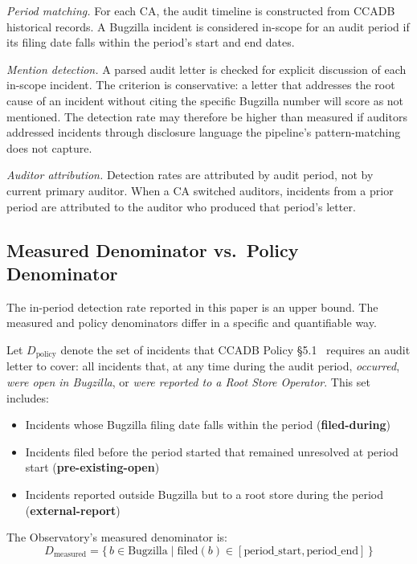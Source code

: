 \documentclass[10pt,twocolumn,letterpaper]{article}
\begin{document}
\textit{Period matching.} For each CA, the audit timeline is constructed
from CCADB historical records. A Bugzilla incident is considered in-scope
for an audit period if its filing date falls within the period's start
and end dates.

\textit{Mention detection.} A parsed audit letter is checked for
explicit discussion of each in-scope incident. The criterion is
conservative: a letter that addresses the root cause of an incident
without citing the specific Bugzilla number will score as not mentioned.
The detection rate may therefore be higher than measured if auditors
addressed incidents through disclosure language the pipeline's
pattern-matching does not capture.

\textit{Auditor attribution.} Detection rates are attributed by audit
period, not by current primary auditor. When a CA switched auditors,
incidents from a prior period are attributed to the auditor who produced
that period's letter.

\subsection{Measured Denominator vs.\ Policy Denominator}
\label{sec:denominator-method}

The in-period detection rate reported in this paper is an upper bound.
The measured and policy denominators differ in a specific and
quantifiable way.

Let $D_\text{policy}$ denote the set of incidents that CCADB Policy
\S5.1~\cite{ccadb-policy} requires an audit letter to cover: all
incidents that, at any time during the audit period, \textit{occurred},
\textit{were open in Bugzilla}, or \textit{were reported to a Root
Store Operator}. This set includes:
\begin{itemize}[noitemsep,topsep=2pt]
\item Incidents whose Bugzilla filing date falls within the period (\textbf{filed-during})
\item Incidents filed before the period started that remained unresolved at period start (\textbf{pre-existing-open})
\item Incidents reported outside Bugzilla but to a root store during the period (\textbf{external-report})
\end{itemize}

The Observatory's measured denominator is:
\[
D_\text{measured} = \{\,b \in \text{Bugzilla} \mid \text{filed}(b) \in [\text{period\_start}, \text{period\_end}]\,\}
\]
\end{document}
